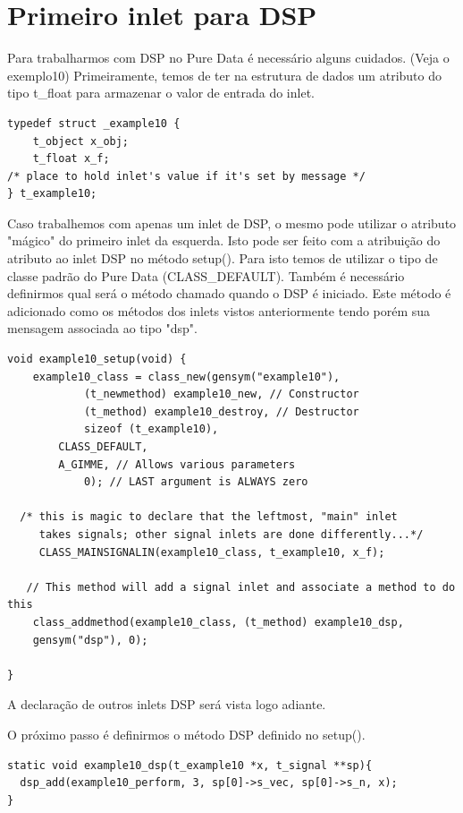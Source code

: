 \documentclass[10pt,a4paper]{report}
\begin{document}
\section{Primeiro inlet para DSP}
Para trabalharmos com DSP no Pure Data é necessário alguns cuidados. (Veja o exemplo10) Primeiramente, temos de ter na estrutura de dados um atributo do tipo t\_float para armazenar o valor de entrada do inlet.

\begin{lstlisting}
typedef struct _example10 {
    t_object x_obj;
    t_float x_f;
/* place to hold inlet's value if it's set by message */
} t_example10;
\end{lstlisting}

Caso trabalhemos com apenas um inlet de DSP, o mesmo pode utilizar o atributo "mágico" do primeiro inlet da esquerda. Isto pode ser feito com a atribuição do atributo ao inlet DSP no método setup(). Para isto temos de utilizar o tipo de classe padrão do Pure Data (CLASS\_DEFAULT). Também é necessário definirmos qual será o método chamado quando o DSP é iniciado. Este método é adicionado como os métodos dos inlets vistos anteriormente tendo porém sua mensagem associada ao tipo "dsp".

\begin{lstlisting}
void example10_setup(void) {
    example10_class = class_new(gensym("example10"),
            (t_newmethod) example10_new, // Constructor
            (t_method) example10_destroy, // Destructor
            sizeof (t_example10),
	    CLASS_DEFAULT,
	    A_GIMME, // Allows various parameters
            0); // LAST argument is ALWAYS zero

  /* this is magic to declare that the leftmost, "main" inlet
     takes signals; other signal inlets are done differently...*/
     CLASS_MAINSIGNALIN(example10_class, t_example10, x_f);

   // This method will add a signal inlet and associate a method to do this
    class_addmethod(example10_class, (t_method) example10_dsp, 
	gensym("dsp"), 0); 

}
\end{lstlisting}
 
A declaração de outros inlets DSP será vista logo adiante.

O próximo passo é definirmos o método DSP definido no setup().

\begin{lstlisting}
static void example10_dsp(t_example10 *x, t_signal **sp){
  dsp_add(example10_perform, 3, sp[0]->s_vec, sp[0]->s_n, x); 
}
\end{lstlisting}
\end{document}
